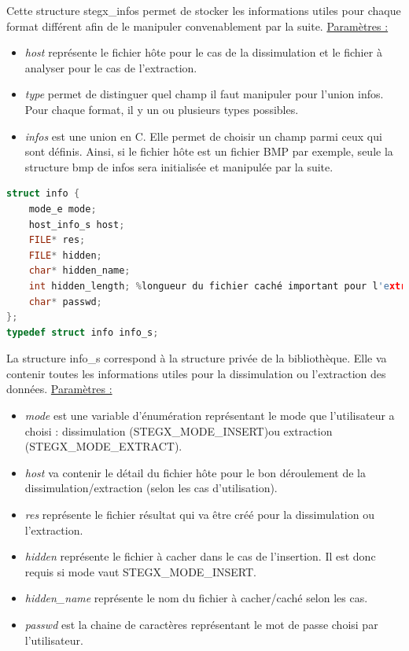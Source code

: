 \documentclass[11pt]{article}
\begin{document}
Cette structure stegx\_infos permet de stocker les informations 
utiles pour chaque format différent afin de le manipuler convenablement 
par la suite. 
\newline
\underline{Paramètres :}
\begin{itemize}
\item \textit{host} représente le fichier hôte pour le cas de la dissimulation 
et le fichier à analyser pour le cas de l'extraction. 
\item \textit{type} permet de distinguer quel champ il faut manipuler pour l'union 
infos. Pour chaque format, il y un ou plusieurs types possibles.
\item \textit{infos} est une union en C. Elle permet de choisir un champ parmi
ceux qui sont définis. Ainsi, si le fichier hôte est un fichier BMP par exemple, 
seule la structure bmp de infos sera initialisée et manipulée par la suite.
\newline
\end{itemize}

\begin{lstlisting}[language=c]
struct info {
    mode_e mode;                
    host_info_s host;           
    FILE* res;                 
    FILE* hidden;              
    char* hidden_name;
    int hidden_length; %longueur du fichier caché important pour l'extraction
    char* passwd;
};
typedef struct info info_s;
\end{lstlisting}

La structure info\_s correspond à la structure privée de la bibliothèque. 
Elle va contenir toutes les informations utiles pour la dissimulation ou 
l'extraction des données. 
\newline
\underline{Paramètres :}
\begin{itemize}
\item \textit{mode} est une variable d'énumération représentant le mode que 
l'utilisateur a choisi : dissimulation (STEGX\_MODE\_INSERT)ou extraction 
(STEGX\_MODE\_EXTRACT). 
\item \textit{host} va contenir le détail du fichier hôte pour le bon déroulement 
de la dissimulation/extraction (selon les cas d'utilisation). 
\item \textit{res} représente le fichier résultat qui va être créé pour la 
dissimulation ou l'extraction.  
\item \textit{hidden} représente le fichier à cacher dans le cas de l'insertion. 
Il est donc requis si mode vaut STEGX\_MODE\_INSERT. 
\item \textit{hidden\_name} représente le nom du fichier à cacher/caché selon 
les cas. 
\item \textit{passwd} est la chaine de caractères représentant le mot de passe 
choisi par l'utilisateur. 
\newline
\end{itemize}
\end{document}
